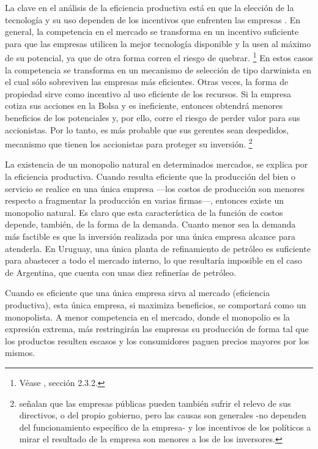 \documentclass[
  12pt,
  spanish,
]{book}
\begin{document}
La clave en el análisis de la eficiencia productiva está en que la elección de la tecnología y su uso dependen de los incentivos que enfrenten las empresas \citep{Nickell1997}. En general, la competencia en el mercado se transforma en un incentivo suficiente para que las empresas utilicen la mejor tecnología disponible y la usen al máximo de su potencial, ya que de otra forma corren el riesgo de quebrar.
\footnote{Véase \citet{Motta2004}, sección 2.3.2.}
En estos casos la competencia se transforma en un mecanismo de selección de tipo darwinista en el cual sólo sobreviven las empresas más eficientes. Otras veces, la forma de propiedad sirve como incentivo al uso eficiente de los recursos. Si la empresa cotiza sus acciones en la Bolsa y es ineficiente, entonces obtendrá menores beneficios de los potenciales y, por ello, corre el riesgo de perder valor para sus accionistas. Por lo tanto, es más probable que sus gerentes sean despedidos, mecanismo que tienen los accionistas para proteger su inversión.
\footnote{\citet{Laffont1993} señalan que las empresas públicas pueden también sufrir el relevo de sus directivos, o del propio gobierno, pero las causas son generales -no dependen del funcionamiento específico de la empresa- y los incentivos de los políticos a mirar el resultado de la empresa son menores a los de los inversores.}

La existencia de un monopolio natural en determinados mercados, se explica por la eficiencia productiva. Cuando resulta eficiente que la producción del bien o servicio se realice en una única empresa ---los costos de producción son menores respecto a fragmentar la producción en varias firmas---, entonces existe un monopolio natural. Es claro que esta característica de la función de costos depende, también, de la forma de la demanda. Cuanto menor sea la demanda más factible es que la inversión realizada por una única empresa alcance para atenderla. En Uruguay, una única planta de refinamiento de petróleo es suficiente para abastecer a todo el mercado interno, lo que resultaría imposible en el caso de Argentina, que cuenta con unas diez refinerías de petróleo.

Cuando es eficiente que una única empresa sirva al mercado (eficiencia productiva), esta única empresa, si maximiza beneficios, se comportará como un monopolista. A menor competencia en el mercado, donde el monopolio es la expresión extrema, más restringirán las empresas su producción de forma tal que los productos resulten escasos y los consumidores paguen precios mayores por los mismos.
\end{document}

